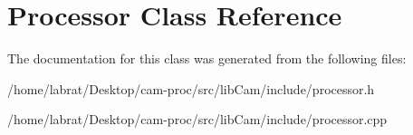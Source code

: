 \hypertarget{classProcessor}{}\section{Processor Class Reference}
\label{classProcessor}


The documentation for this class was generated from the following files\+:\begin{DoxyCompactItemize}
\item 
/home/labrat/\+Desktop/cam-\/proc/src/lib\+Cam/include/processor.\+h\item 
/home/labrat/\+Desktop/cam-\/proc/src/lib\+Cam/include/processor.\+cpp\end{DoxyCompactItemize}

